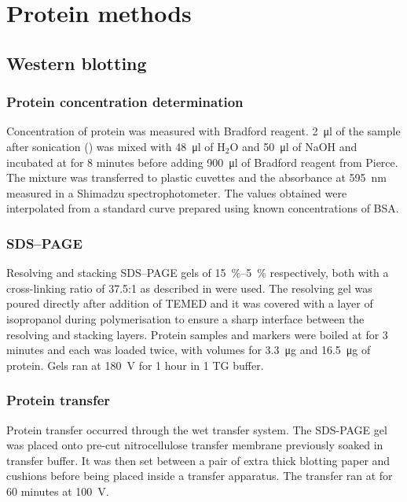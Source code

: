   \section{Protein methods}
    \subsection{Western blotting}
      \subsubsection{Protein concentration determination}
        Concentration of protein was measured with Bradford reagent.
        \SI{2}{\ul} of the sample after sonication ()
        was mixed with \SI{48}{\ul} of H$_2$O and \SI{50}{\ul} of NaOH and
        incubated at  for 8 minutes before adding \SI{900}{\ul} of
        Bradford reagent from Pierce. The mixture was transferred to plastic
        cuvettes and the absorbance at \SI{595}{\nm} measured in a Shimadzu
        spectrophotometer. The values obtained were interpolated from a
        standard curve prepared using known concentrations of BSA.

      \subsubsection{SDS--PAGE}
        Resolving and stacking SDS--PAGE gels of \SIrange{15}{5}{\percent}
        respectively, both with a cross-linking ratio of \num{37.5}:1 as
        described in \citet{harlow_electrophoresis_1988} were used. The
        resolving gel was poured directly after addition
        of TEMED and it was covered with a layer of isopropanol during polymerisation
        to ensure a sharp interface between the resolving and stacking layers.
        Protein samples and markers were boiled at  for 3 minutes and each
        was loaded twice, with volumes for \SI{3.3}{\ug} and \SI{16.5}{\ug} of
        protein. Gels ran at \SI{180}{\volt} for 1 hour in \SI{1}{\X} TG buffer.

      \subsubsection{Protein transfer}
        Protein transfer occurred through the wet transfer system. The
        SDS-PAGE gel was placed onto pre-cut nitrocellulose transfer membrane
        previously soaked in transfer buffer. It was then set between a pair
        of extra thick blotting paper and cushions before being placed inside
        a transfer apparatus. The transfer ran at  for 60
        minutes at \SI{100}{\volt}.

